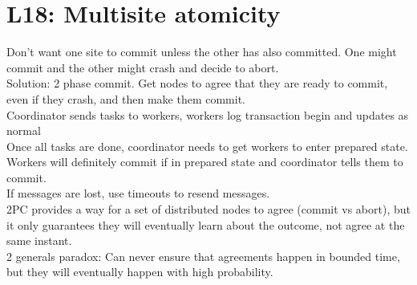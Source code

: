 \section{L18: Multisite atomicity}
Don't want one site to commit unless the other has also committed. One might commit and the other might crash and decide to abort.\\
Solution: 2 phase commit. Get nodes to agree that they are ready to commit, even if they crash, and then make them commit.\\
Coordinator sends tasks to workers, workers log transaction begin and updates as normal\\
Once all tasks are done, coordinator needs to get workers to enter prepared state.\\
Workers will definitely commit if in prepared state and coordinator tells them to commit.\\
If messages are lost, use timeouts to resend messages.\\
2PC provides a way for a set of distributed nodes to agree (commit vs abort), but it only guarantees they will eventually learn about the outcome, not agree at the same instant.\\
2 generals paradox: Can never ensure that agreements happen in bounded time, but they will eventually happen with high probability.
